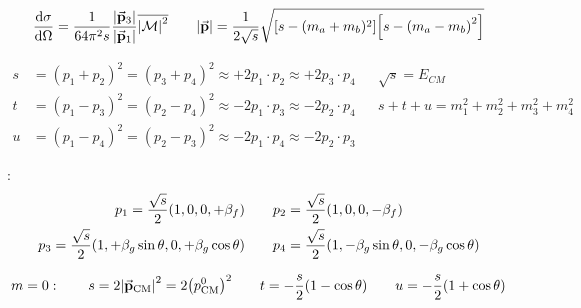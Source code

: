 \begin{equation*}
        \dv{\sigma}{\Omega} = \frac{1}{64\pi^2s}\frac{\abs{\va{p}_{3}}}{\abs{\va{p}_{1}}}\overline{\abs{\operatorname{\mathcal{M}}}^2}
        \qquad
        \abs{\va{p}} = \frac{1}{2\sqrt{s}}\sqrt{\qty[s - (m_a+m_b)^2]\qty[s - \qty(m_a-m_b)^2]}
\end{equation*}

\begin{align*}
        s
        &= (p_1 + p_2)^2 = (p_3 + p_4)^2
        \approx +2p_1\cdot p_2 \approx +2p_3\cdot p_4
        &&
        \sqrt{s} = E_{CM}
        \\
        t
        &= (p_1 - p_3)^2 = (p_2 - p_4)^2
        \approx -2p_1\cdot p_3 \approx -2p_2\cdot p_4
        &&
        s + t + u = m_1^2 + m_2^2 + m_3^2 + m_4^2
        \\
        u
        &= (p_1 - p_4)^2 = (p_2 - p_3)^2
        \approx -2p_1\cdot p_4 \approx -2p_2\cdot p_3
\end{align*}

:
\begin{gather*}
        p_1 = \frac{\sqrt{s}}{2}\qty(1, 0, 0, +\beta_f)
        \qquad
        p_2 = \frac{\sqrt{s}}{2}\qty(1, 0, 0, -\beta_f)
        \\
        p_3 = \frac{\sqrt{s}}{2}\qty(1, +\beta_g\sin\theta, 0, +\beta_g\cos\theta)
        \qquad
        p_4 = \frac{\sqrt{s}}{2}\qty(1, -\beta_g\sin\theta, 0, -\beta_g\cos\theta)
\end{gather*}

\begin{equation*}
        m=0
        :\qquad
        s
        = 2\abs{\va{p}_{\mathrm{CM}}}^2
        = 2\qty(p^0_{\mathrm{CM}})^2
        \qquad
        t = -\frac{s}{2}\qty(1 - \cos\theta)
        \qquad
        u = -\frac{s}{2}\qty(1 + \cos\theta)
\end{equation*}
